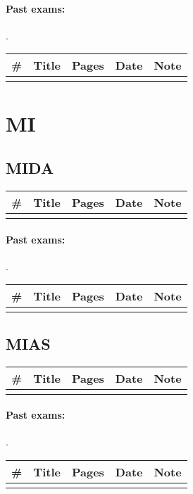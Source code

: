 \documentclass[a4paper,12pt]{article} %
\begin{document}
\paragraph{Past exams:}.\\
\begin{tabularx}{\textwidth}{|l|X|c|l|c|}
	\hline
	\# & Title & Pages & Date & Note \\
	\hline
	&  &  &  &  \\
	\hline
\end{tabularx}

\newpage
\section{MI}
\subsection{MIDA}
\begin{tabularx}{\textwidth}{|l|X|c|l|c|}
	\hline
	\# & Title & Pages & Date & Note \\
	\hline
	&  &  &  &  \\
	\hline
\end{tabularx}

\paragraph{Past exams:}.\\
\begin{tabularx}{\textwidth}{|l|X|c|l|c|}
	\hline
	\# & Title & Pages & Date & Note \\
	\hline
	&  &  &  &  \\
	\hline
\end{tabularx}

\subsection{MIAS}
\begin{tabularx}{\textwidth}{|l|X|c|l|c|}
	\hline
	\# & Title & Pages & Date & Note \\
	\hline
	&  &  &  &  \\
	\hline
\end{tabularx}

\paragraph{Past exams:}.\\
\begin{tabularx}{\textwidth}{|l|X|c|l|c|}
	\hline
	\# & Title & Pages & Date & Note \\
	\hline
	&  &  &  &  \\
	\hline
\end{tabularx}

\end{document}
